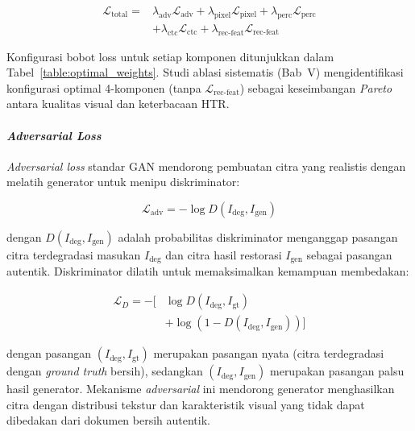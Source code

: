 \documentclass[12pt,a4paper]{article}
\begin{document}
\begin{equation}
  \begin{split}
    \mathcal{L}_{\text{total}} = &\lambda_{\text{adv}}\mathcal{L}_{\text{adv}} + \lambda_{\text{pixel}}\mathcal{L}_{\text{pixel}} + \lambda_{\text{perc}}\mathcal{L}_{\text{perc}} \\
    &+ \lambda_{\text{ctc}}\mathcal{L}_{\text{ctc}} + \lambda_{\text{rec-feat}}\mathcal{L}_{\text{rec-feat}}
  \end{split}
  \label{eq:IV.12}
\end{equation}

Konfigurasi bobot loss untuk setiap komponen ditunjukkan dalam Tabel~\ref{table:optimal_weights}. Studi ablasi sistematis (Bab~V) mengidentifikasi konfigurasi optimal 4-komponen (tanpa $\mathcal{L}_{\text{rec-feat}}$) sebagai keseimbangan \textit{Pareto} antara kualitas visual dan keterbacaan HTR.

\paragraph{\textit{Adversarial Loss}}

\textit{Adversarial loss} standar GAN mendorong pembuatan citra yang realistis dengan melatih generator untuk menipu diskriminator:

\begin{equation}
  \mathcal{L}_{\text{adv}} = -\log D(I_{\text{deg}}, I_{\text{gen}})
  \label{eq:IV.13}
\end{equation}

dengan $D(I_{\text{deg}}, I_{\text{gen}})$ adalah probabilitas diskriminator menganggap pasangan citra terdegradasi masukan $I_{\text{deg}}$ dan citra hasil restorasi $I_{\text{gen}}$ sebagai pasangan autentik. Diskriminator dilatih untuk memaksimalkan kemampuan membedakan:

\begin{equation}
  \begin{split}
    \mathcal{L}_D = -[&\log D(I_{\text{deg}}, I_{\text{gt}}) \\
    &+ \log(1 - D(I_{\text{deg}}, I_{\text{gen}}))]
  \end{split}
  \label{eq:IV.14}
\end{equation}

dengan pasangan $(I_{\text{deg}}, I_{\text{gt}})$ merupakan pasangan nyata (citra terdegradasi dengan \textit{ground truth} bersih), sedangkan $(I_{\text{deg}}, I_{\text{gen}})$ merupakan pasangan palsu hasil generator. Mekanisme \textit{adversarial} ini mendorong generator menghasilkan citra dengan distribusi tekstur dan karakteristik visual yang tidak dapat dibedakan dari dokumen bersih autentik.
\end{document}
